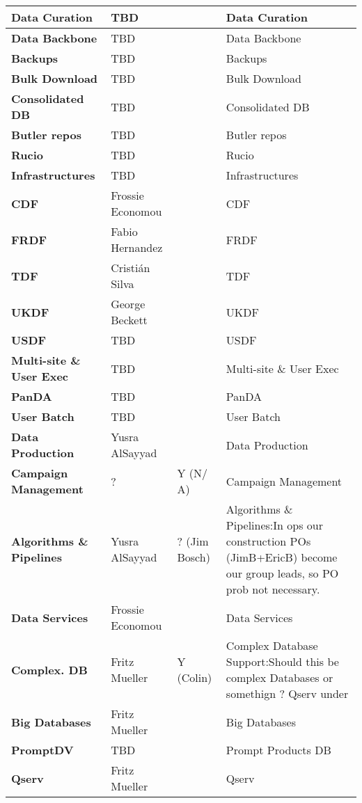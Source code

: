 \begin{longtable}{
p{}   |p{}|p{} |p{}|}
{\textbf{Data Curation}} & TBD &  & Data Curation \\ \hline
{\textbf{Data Backbone}} & TBD &  & Data Backbone \\ \hline
{\textbf{Backups}} & TBD &  & Backups \\ \hline
{\textbf{Bulk Download}} & TBD &  & Bulk Download \\ \hline
{\textbf{Consolidated DB}} & TBD &  & Consolidated DB \\ \hline
{\textbf{Butler repos}} & TBD &  & Butler repos \\ \hline
{\textbf{Rucio}} & TBD &  & Rucio \\ \hline
{\textbf{Infrastructures}} & TBD &  & Infrastructures \\ \hline
{\textbf{CDF}} & Frossie Economou &  & CDF \\ \hline
{\textbf{FRDF}} & Fabio Hernandez &  & FRDF \\ \hline
{\textbf{TDF}} & Cristián Silva &  & TDF \\ \hline
{\textbf{UKDF}} & George Beckett &  & UKDF \\ \hline
{\textbf{USDF}} & TBD &  & USDF \\ \hline
{\textbf{Multi-site \&  User Exec}} & TBD &  & Multi-site \&  User Exec \\ \hline
{\textbf{PanDA}} & TBD &  & PanDA \\ \hline
{\textbf{User Batch}} & TBD &  & User Batch \\ \hline
{\textbf{Data Production}} & Yusra AlSayyad &  & Data Production \\ \hline
{\textbf{Campaign Management}} & ? & Y (N/ A) & Campaign Management \\ \hline
{\textbf{Algorithms \&  Pipelines}} & Yusra AlSayyad & ? (Jim Bosch) & Algorithms \&  Pipelines:In ops our construction POs (JimB+EricB) become our group leads, so PO prob not necessary. \\ \hline
{\textbf{Data Services}} & Frossie Economou &  & Data Services \\ \hline
{\textbf{Complex. DB}} & Fritz Mueller & Y (Colin) & Complex Database Support:Should this be complex Databases or somethign ? Qserv under \\ \hline
{\textbf{Big Databases}} & Fritz Mueller &  & Big Databases \\ \hline
{\textbf{PromptDV}} & TBD &  & Prompt Products DB \\ \hline
{\textbf{Qserv}} & Fritz Mueller &  & Qserv \\ \hline

\end{longtable}
